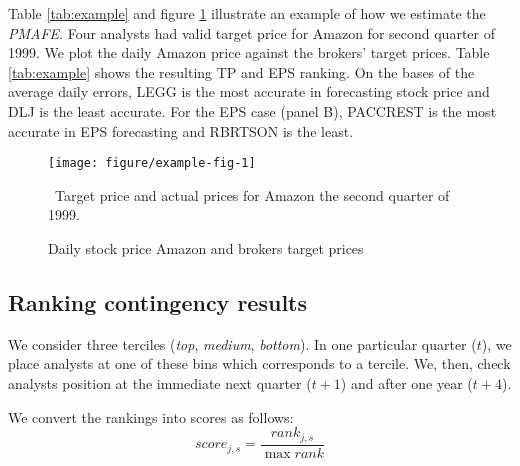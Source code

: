 \documentclass{book}
\begin{document}
Table \ref{tab:example} and figure \ref{fig:example} illustrate an example of how we estimate the \textit{PMAFE}. Four analysts had valid target price for Amazon for second quarter of 1999. We plot the daily Amazon price against the brokers' target prices. Table \ref{tab:example} shows the resulting TP and EPS ranking. On the bases of the average daily errors, LEGG is the most accurate in forecasting stock price and  DLJ is the least accurate. For the EPS case (panel B), PACCREST is the most accurate in EPS forecasting and RBRTSON is the least. 

\begin{figure}
\begin{center}
\texttt{[image: figure/example-fig-1]}
\end{center}
\caption{Daily stock price Amazon and brokers target prices}
\label{fig:example}
\ Target price and actual prices for Amazon  the second quarter of 1999.
\end{figure}

\subsection{Ranking contingency results}
We consider  three terciles (\textit{top}, \textit{medium}, \textit{bottom}). In one particular quarter ($t$), we place  analysts at one of these bins which corresponds to a tercile. We, then,  check analysts position at the immediate next quarter ($t+1$) and after one year ($t+4$).   

We convert the rankings into scores as follows:
\begin{equation}
\label{eq:score}
score_{j,s}=\frac{rank_{j,s}}{\max{rank}}
\end{equation}
\end{document}
